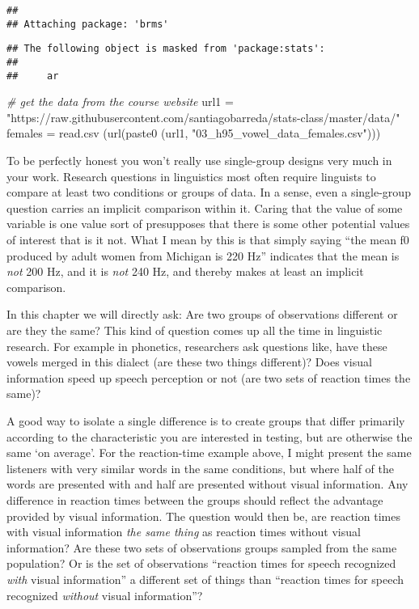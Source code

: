 \documentclass[
]{book}
\newenvironment{Shaded}{\begin{snugshade}}{\end{snugshade}}
\newcommand{\CommentTok}[1]{\textcolor[rgb]{0.56,0.35,0.01}{\textit{#1}}}
\newcommand{\FunctionTok}[1]{\textcolor[rgb]{0.00,0.00,0.00}{#1}}
\newcommand{\NormalTok}[1]{#1}
\newcommand{\OtherTok}[1]{\textcolor[rgb]{0.56,0.35,0.01}{#1}}
\newcommand{\StringTok}[1]{\textcolor[rgb]{0.31,0.60,0.02}{#1}}
\begin{document}
\begin{verbatim}
## 
## Attaching package: 'brms'
\end{verbatim}

\begin{verbatim}
## The following object is masked from 'package:stats':
## 
##     ar
\end{verbatim}

\begin{Shaded}
\begin{Highlighting}[]
\CommentTok{\# get the data from the course website}
\NormalTok{url1 }\OtherTok{=} \StringTok{"https://raw.githubusercontent.com/santiagobarreda/stats{-}class/master/data/"}
\NormalTok{females }\OtherTok{=} \FunctionTok{read.csv}\NormalTok{ (}\FunctionTok{url}\NormalTok{(}\FunctionTok{paste0}\NormalTok{ (url1, }\StringTok{"03\_h95\_vowel\_data\_females.csv"}\NormalTok{)))}
\end{Highlighting}
\end{Shaded}

To be perfectly honest you won't really use single-group designs very much in your work. Research questions in linguistics most often require linguists to compare at least two conditions or groups of data. In a sense, even a single-group question carries an implicit comparison within it. Caring that the value of some variable is one value sort of presupposes that there is some other potential values of interest that is it not. What I mean by this is that simply saying ``the mean f0 produced by adult women from Michigan is 220 Hz'' indicates that the mean is \emph{not} 200 Hz, and it is \emph{not} 240 Hz, and thereby makes at least an implicit comparison.

In this chapter we will directly ask: Are two groups of observations different or are they the same? This kind of question comes up all the time in linguistic research. For example in phonetics, researchers ask questions like, have these vowels merged in this dialect (are these two things different)? Does visual information speed up speech perception or not (are two sets of reaction times the same)?

A good way to isolate a single difference is to create groups that differ primarily according to the characteristic you are interested in testing, but are otherwise the same `on average'. For the reaction-time example above, I might present the same listeners with very similar words in the same conditions, but where half of the words are presented with and half are presented without visual information. Any difference in reaction times between the groups should reflect the advantage provided by visual information. The question would then be, are reaction times with visual information \emph{the same thing} as reaction times without visual information? Are these two sets of observations groups sampled from the same population? Or is the set of observations ``reaction times for speech recognized \emph{with} visual information'' a different set of things than ``reaction times for speech recognized \emph{without} visual information''?
\end{document}
